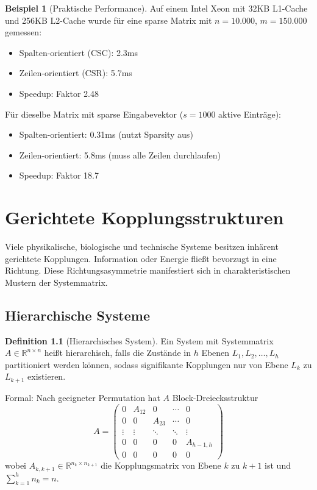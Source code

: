 \documentclass[a4paper,12pt]{report}
\theoremstyle{definition}
\newtheorem{definition}{Definition}
\newtheorem{beispiel}{Beispiel}
\begin{document}
	\begin{beispiel}[Praktische Performance]
		Auf einem Intel Xeon mit 32KB L1-Cache und 256KB L2-Cache wurde für eine sparse Matrix mit $n = 10.000$, $m = 150.000$ gemessen:
		\begin{itemize}
			\item Spalten-orientiert (CSC): 2.3ms
			\item Zeilen-orientiert (CSR): 5.7ms
			\item Speedup: Faktor 2.48
		\end{itemize}
		
		Für dieselbe Matrix mit sparse Eingabevektor ($s = 1000$ aktive Einträge):
		\begin{itemize}
			\item Spalten-orientiert: 0.31ms (nutzt Sparsity aus)
			\item Zeilen-orientiert: 5.8ms (muss alle Zeilen durchlaufen)
			\item Speedup: Faktor 18.7
		\end{itemize}
	\end{beispiel}
	
	\chapter{Gerichtete Kopplungsstrukturen}
	
	Viele physikalische, biologische und technische Systeme besitzen inhärent gerichtete Kopplungen. Information oder Energie fließt bevorzugt in eine Richtung. Diese Richtungsasymmetrie manifestiert sich in charakteristischen Mustern der Systemmatrix.
	
	\section{Hierarchische Systeme}
	
	\begin{definition}[Hierarchisches System]
		Ein System mit Systemmatrix $A \in \mathbb{R}^{n \times n}$ heißt hierarchisch, falls die Zustände in $h$ Ebenen $L_1, L_2, \ldots, L_h$ partitioniert werden können, sodass signifikante Kopplungen nur von Ebene $L_k$ zu $L_{k+1}$ existieren.
		
		Formal: Nach geeigneter Permutation hat $A$ Block-Dreiecksstruktur
		\[
		A = \begin{pmatrix}
			0 & A_{12} & 0 & \cdots & 0 \\
			0 & 0 & A_{23} & \cdots & 0 \\
			\vdots & \vdots & \ddots & \ddots & \vdots \\
			0 & 0 & 0 & 0 & A_{h-1,h} \\
			0 & 0 & 0 & 0 & 0
		\end{pmatrix}
		\]
		wobei $A_{k,k+1} \in \mathbb{R}^{n_k \times n_{k+1}}$ die Kopplungsmatrix von Ebene $k$ zu $k+1$ ist und $\sum_{k=1}^h n_k = n$.
	\end{definition}
	
\end{document}
